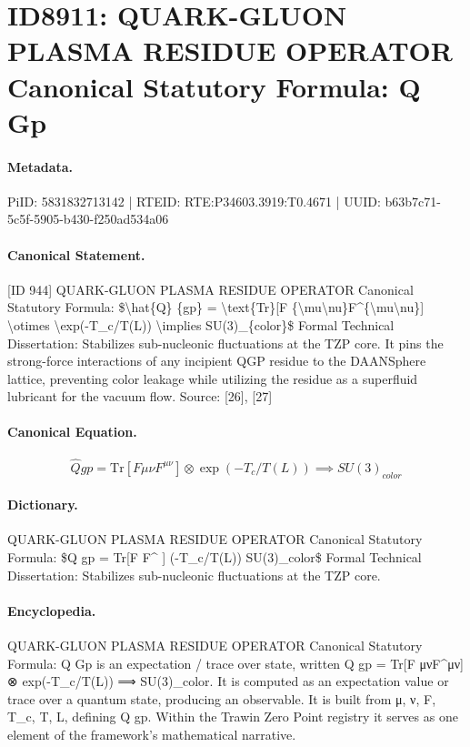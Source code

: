 \section*{ID8911: QUARK-GLUON PLASMA RESIDUE OPERATOR Canonical Statutory Formula: Q Gp}
\paragraph{Metadata.}
PiID: 5831832713142 | RTEID: RTE:P34603.3919:T0.4671 | UUID: b63b7c71-5c5f-5905-b430-f250ad534a06

\paragraph{Canonical Statement.}
[ID 944] QUARK-GLUON PLASMA RESIDUE OPERATOR Canonical Statutory Formula: \$\textbackslash{}hat\{Q\} \{gp\} = \textbackslash{}text\{Tr\}[F \{\textbackslash{}mu\textbackslash{}nu\}F\textasciicircum{}\{\textbackslash{}mu\textbackslash{}nu\}] \textbackslash{}otimes \textbackslash{}exp(-T\_c/T(L)) \textbackslash{}implies SU(3)\_\{color\}\$ Formal Technical Dissertation: Stabilizes sub-nucleonic fluctuations at the TZP core. It pins the strong-force interactions of any incipient QGP residue to the DAANSphere lattice, preventing color leakage while utilizing the residue as a superfluid lubricant for the vacuum flow. Source: [26], [27]

\paragraph{Canonical Equation.}
\[
\hat{Q} {gp} = \text{Tr}[F {\mu\nu}F^{\mu\nu}] \otimes \exp(-T_c/T(L)) \implies SU(3)_{color}
\]

\paragraph{Dictionary.}
QUARK-GLUON PLASMA RESIDUE OPERATOR Canonical Statutory Formula: \$Q gp = Tr[F F\textasciicircum{} ] (-T\_c/T(L)) SU(3)\_color\$ Formal Technical Dissertation: Stabilizes sub-nucleonic fluctuations at the TZP core.

\paragraph{Encyclopedia.}
QUARK-GLUON PLASMA RESIDUE OPERATOR Canonical Statutory Formula: Q Gp is an expectation / trace over state, written Q gp = Tr[F μνF\textasciicircum{}μν] ⊗ exp(-T\_c/T(L)) ⟹ SU(3)\_color. It is computed as an expectation value or trace over a quantum state, producing an observable. It is built from μ, ν, F, T\_c, T, L, defining Q gp. Within the Trawin Zero Point registry it serves as one element of the framework's mathematical narrative.
